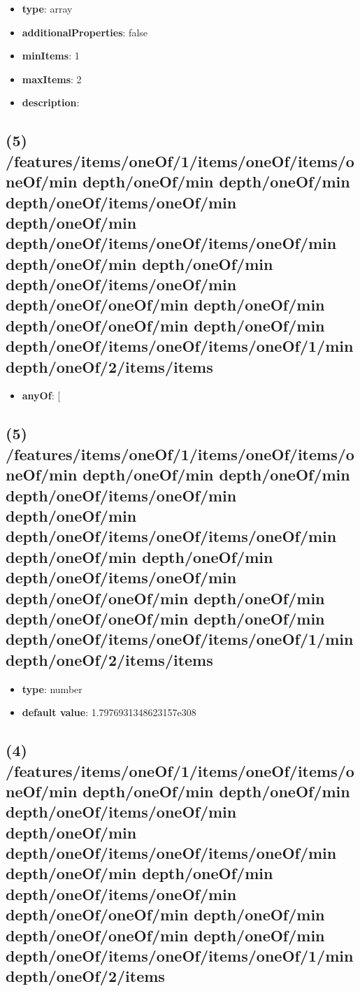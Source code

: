 \begin{itemize}[leftmargin=4em]\item {\bf type}: array
\item {\bf additionalProperties}: false
\item {\bf minItems}: 1
\item {\bf maxItems}: 2
\item {\bf description}: 
\end{itemize}\subsection{(5) /features/items/oneOf/1/items/oneOf/items/oneOf/min depth/oneOf/min depth/oneOf/min depth/oneOf/items/oneOf/min depth/oneOf/min depth/oneOf/items/oneOf/items/oneOf/min depth/oneOf/min depth/oneOf/min depth/oneOf/items/oneOf/min depth/oneOf/oneOf/min depth/oneOf/min depth/oneOf/oneOf/min depth/oneOf/min depth/oneOf/items/oneOf/items/oneOf/1/min depth/oneOf/2/items/items}
\begin{itemize}[leftmargin=5em]\item {\bf anyOf}: [\end{itemize}\subsection{(5) /features/items/oneOf/1/items/oneOf/items/oneOf/min depth/oneOf/min depth/oneOf/min depth/oneOf/items/oneOf/min depth/oneOf/min depth/oneOf/items/oneOf/items/oneOf/min depth/oneOf/min depth/oneOf/min depth/oneOf/items/oneOf/min depth/oneOf/oneOf/min depth/oneOf/min depth/oneOf/oneOf/min depth/oneOf/min depth/oneOf/items/oneOf/items/oneOf/1/min depth/oneOf/2/items/items}
\begin{itemize}[leftmargin=5em]\item {\bf type}: number\item {\bf default value}: 1.7976931348623157e308
\end{itemize}\subsection{(4) /features/items/oneOf/1/items/oneOf/items/oneOf/min depth/oneOf/min depth/oneOf/min depth/oneOf/items/oneOf/min depth/oneOf/min depth/oneOf/items/oneOf/items/oneOf/min depth/oneOf/min depth/oneOf/min depth/oneOf/items/oneOf/min depth/oneOf/oneOf/min depth/oneOf/min depth/oneOf/oneOf/min depth/oneOf/min depth/oneOf/items/oneOf/items/oneOf/1/min depth/oneOf/2/items}
